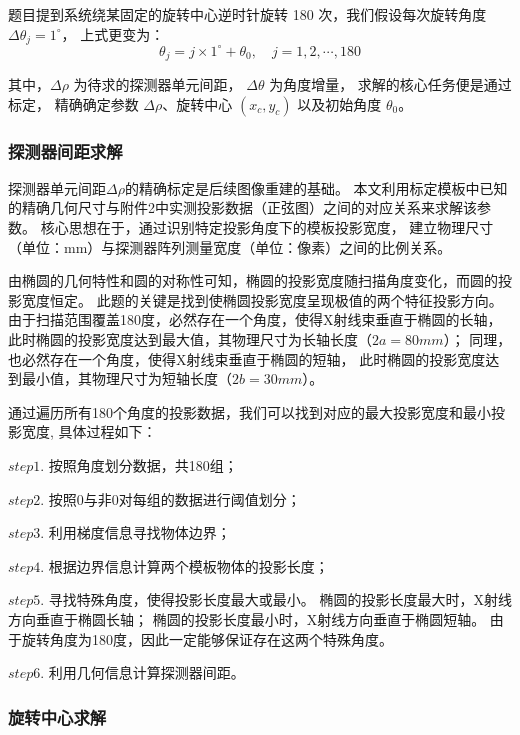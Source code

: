 题目提到系统绕某固定的旋转中心逆时针旋转 180 次，我们假设每次旋转角度 $\Delta\theta_j = 1^\circ$，
上式更变为：
\begin{equation*}
    \theta_j = j \times 1^\circ + \theta_0, \quad j=1,2,\cdots,180
\end{equation*}

其中，$\Delta\rho$ 为待求的探测器单元间距，
$\Delta\theta$ 为角度增量，
求解的核心任务便是通过标定，
精确确定参数 $\Delta\rho$、旋转中心 $(x_c, y_c)$ 以及初始角度 $\theta_0$。


\subsubsection{探测器间距求解}

探测器单元间距$\Delta\rho$的精确标定是后续图像重建的基础。
本文利用标定模板中已知的精确几何尺寸与附件2中实测投影数据（正弦图）之间的对应关系来求解该参数。
核心思想在于，通过识别特定投影角度下的模板投影宽度，
建立物理尺寸（单位：mm）与探测器阵列测量宽度（单位：像素）之间的比例关系。\par


由椭圆的几何特性和圆的对称性可知，椭圆的投影宽度随扫描角度变化，而圆的投影宽度恒定。
此题的关键是找到使椭圆投影宽度呈现极值的两个特征投影方向。
由于扫描范围覆盖180度，必然存在一个角度，使得X射线束垂直于椭圆的长轴，
此时椭圆的投影宽度达到最大值，其物理尺寸为长轴长度（$2a=80mm$）；
同理，也必然存在一个角度，使得X射线束垂直于椭圆的短轴，
此时椭圆的投影宽度达到最小值，其物理尺寸为短轴长度（$2b=30mm$）。\par

通过遍历所有180个角度的投影数据，我们可以找到对应的最大投影宽度和最小投影宽度,
具体过程如下：\par
$step1.$ 按照角度划分数据，共180组；\par
$step2.$ 按照0与非0对每组的数据进行阈值划分；\par
$step3.$ 利用梯度信息寻找物体边界；\par
$step4.$ 根据边界信息计算两个模板物体的投影长度；\par
$step5.$ 寻找特殊角度，使得投影长度最大或最小。
椭圆的投影长度最大时，X射线方向垂直于椭圆长轴；
椭圆的投影长度最小时，X射线方向垂直于椭圆短轴。
由于旋转角度为180度，因此一定能够保证存在这两个特殊角度。\par
$step6.$ 利用几何信息计算探测器间距。


\subsubsection{旋转中心求解}


